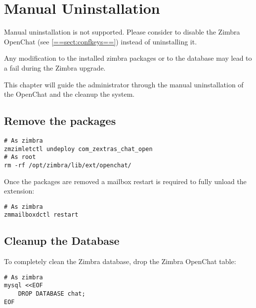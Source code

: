 \section{Manual Uninstallation}

\begin{comment}
WARNING:
\end{comment}
\begin{warning}
    Manual uninstallation is not supported.
    Please consider to disable the Zimbra OpenChat (see \ref{==sect:confkeys==}) instead of uninstalling it.

    Any modification to the installed zimbra packages or to the database may lead to a fail during the Zimbra upgrade.
\end{warning}

This chapter will guide the administrator through the manual uninstallation of the OpenChat and
the cleanup the system.

\subsection{Remove the packages}
    \begin{verbatim}
# As zimbra
zmzimletctl undeploy com_zextras_chat_open
# As root
rm -rf /opt/zimbra/lib/ext/openchat/
    \end{verbatim}

    Once the packages are removed a mailbox restart is required to fully unload the extension:
    \begin{verbatim}
# As zimbra
zmmailboxdctl restart
    \end{verbatim}

\subsection{Cleanup the Database}
    To completely clean the Zimbra database, drop the Zimbra OpenChat table:
    \begin{verbatim}
# As zimbra
mysql <<EOF
    DROP DATABASE chat;
EOF
    \end{verbatim}
